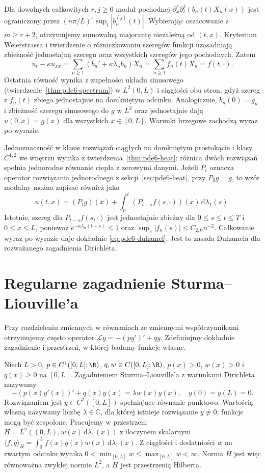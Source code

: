 Dla dowolnych całkowitych $r,j\ge0$ moduł pochodnej
$\partial_x^r\partial_t^j(b_n(t)X_n(x))$ jest
ograniczony przez $(n\pi/L)^r\sup_t|b_n^{(j)}(t)|$.
Wybierając oszacowanie z $m\ge r+2$, otrzymujemy
sumowalną majorantę niezależną od $(t,x)$.
Kryterium Weierstrassa i twierdzenie o różniczkowaniu
szeregów funkcji uzasadniają zbieżność jednostajną
szeregu oraz wszystkich szeregów jego pochodnych.
Zatem
\[
 u_t-\kappa u_{xx}
 =\sum_{n\ge1}(b_n'+\kappa\lambda_nb_n)X_n
 =\sum_{n\ge1}f_n(t)X_n=f(t,\cdot).
\]
Ostatnia równość wynika z zupełności układu sinusowego
(twierdzenie~\ref{thm:pde6-spectrum}) w $L^2(0,L)$
i ciągłości obu stron, gdyż szereg z $f_n(t)$ zbiega
jednostajnie na domkniętym odcinku.
Analogicznie, $b_n(0)=g_n$ i zbieżność szeregu
sinusowego do $g$ w $L^2$ oraz jednostajnie
dają $u(0,x)=g(x)$ dla wszystkich $x\in[0,L]$.
Warunki brzegowe zachodzą wyraz po wyrazie.

Jednoznaczność w klasie rozwiązań ciągłych na domkniętym
prostokącie i klasy $C^{1,2}$ we wnętrzu wynika
z twierdzenia~\ref{thm:pde6-heat}: różnica dwóch rozwiązań
spełnia jednorodne równanie ciepła z zerowymi danymi.
Jeżeli $P_t$ oznacza operator rozwiązania jednorodnego
z sekcji~\ref{sec:pde6-heat}, przy $P_0g=g$, to wzór
modalny można zapisać również jako
\[
 u(t,x)=(P_tg)(x)+
 \int_0^t(P_{t-s}f(s,\cdot))(x)\,\mathrm d\lambda_1(s).
\]
Istotnie, szereg dla $P_{t-s}f(s,\cdot)$ jest jednostajnie
zbieżny dla $0\le s\le t\le T$ i $0\le x\le L$, ponieważ
$e^{-\kappa\lambda_n(t-s)}\le1$ oraz
$\sup_s|f_n(s)|\le C_{2,0}n^{-2}$.
Całkowanie wyraz po wyrazie daje dokładnie
\eqref{eq:pde6-duhamel}. Jest to zasada Duhamela
dla rozważanego zagadnienia Dirichleta.

\section{Regularne zagadnienie Sturma--Liouville'a}
\label{sec:pde6-sturm}

Przy rozdzieleniu zmiennych w równaniach ze
zmiennymi współczynnikami otrzymujemy często operator
$\mathcal L y=-(py')'+qy$. Zdefiniujmy dokładnie
zagadnienie i przestrzeń, w której badamy funkcje własne.

\begin{definicja}
\label{def:pde6-sturm}
Niech $L>0$, $p\in C^1([0,L];\R)$,
$q,w\in C([0,L];\R)$, $p(x)>0$, $w(x)>0$
i $q(x)\ge0$ na $[0,L]$. Zagadnieniem
Sturma--Liouville'a z warunkami Dirichleta nazywamy
\begin{equation}\label{eq:pde6-sturm}
 -(p(x)y'(x))'+q(x)y(x)=\lambda w(x)y(x),
 \quad y(0)=y(L)=0.
\end{equation}
Rozwiązaniem jest $y\in C^2([0,L])$ spełniające
równanie punktowo. Wartością własną nazywamy liczbę
$\lambda\in\mathbb C$, dla której istnieje rozwiązanie
$y\not\equiv0$; funkcje mogą być zespolone. Pracujemy w przestrzeni
$H=L^2((0,L),w(x)\,\mathrm d\lambda_1(x))$ z
iloczynem skalarnym $\langle f,g\rangle_H
=\int_0^Lf(x)\overline{g(x)}w(x)\,\mathrm d\lambda_1(x)$.
Z ciągłości i dodatniości $w$ na zwartym odcinku wynika
$0<\min_{[0,L]}w\le\max_{[0,L]}w<\infty$.
Norma $H$ jest więc równoważna zwykłej normie $L^2$,
a $H$ jest przestrzenią Hilberta.
\end{definicja}


